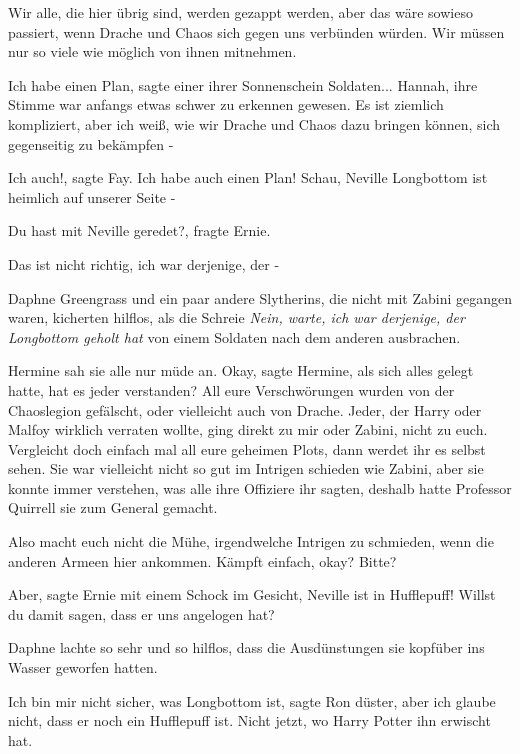 \glqq{}Wir alle, die hier übrig sind, werden gezappt werden, aber das wäre
sowieso passiert, wenn Drache und Chaos sich gegen uns verbünden würden. Wir
müssen nur so viele wie möglich von ihnen mitnehmen.\grqq{}

\glqq{}Ich habe einen Plan\grqq{}, sagte einer ihrer Sonnenschein Soldaten...
Hannah, ihre Stimme war anfangs etwas schwer zu erkennen gewesen. \glqq{}Es ist
ziemlich kompliziert, aber ich weiß, wie wir Drache und Chaos dazu bringen
können, sich gegenseitig zu bekämpfen -\grqq{}

\glqq{}Ich auch!\grqq{}, sagte Fay. \glqq{}Ich habe auch einen Plan! Schau,
Neville Longbottom ist heimlich auf unserer Seite -\grqq{}

\glqq{}Du hast mit Neville geredet?\grqq{}, fragte Ernie.

\glqq{}Das ist nicht richtig, ich war derjenige, der -\grqq{}

Daphne Greengrass und ein paar andere Slytherins, die nicht mit Zabini gegangen
waren, kicherten hilflos, als die Schreie \glqq{}\emph{Nein, warte, ich war
derjenige, der Longbottom geholt hat\grqq{}} von einem Soldaten nach dem
anderen ausbrachen.

Hermine sah sie alle nur müde an. \glqq{}Okay\grqq{}, sagte Hermine, als sich
alles gelegt hatte, \glqq{}hat es jeder verstanden? All eure Verschwörungen
wurden von der Chaoslegion gefälscht, oder vielleicht auch von Drache. Jeder,
der Harry oder Malfoy wirklich verraten wollte, ging direkt zu mir oder Zabini,
nicht zu euch. Vergleicht doch einfach mal all eure geheimen Plots, dann werdet
ihr es selbst sehen.\grqq{} Sie war vielleicht nicht so gut im Intrigen schieden wie
Zabini, aber sie konnte immer verstehen, was alle ihre Offiziere ihr sagten,
deshalb hatte Professor Quirrell sie zum General gemacht.

\glqq{}Also macht euch nicht die Mühe, irgendwelche Intrigen zu schmieden, wenn
die anderen Armeen hier ankommen. Kämpft einfach, okay? Bitte?\grqq{}

\glqq{}Aber\grqq{}, sagte Ernie mit einem Schock im Gesicht, \glqq{}Neville ist in
Hufflepuff! Willst du damit sagen, dass er uns angelogen hat?\grqq{}

Daphne lachte so sehr und so hilflos, dass die Ausdünstungen sie kopfüber ins
Wasser geworfen hatten.

\glqq{}Ich bin mir nicht sicher, was Longbottom ist\grqq{}, sagte Ron düster,
\glqq{}aber ich glaube nicht, dass er noch ein Hufflepuff ist. Nicht jetzt, wo
Harry Potter ihn erwischt hat.\grqq{}

